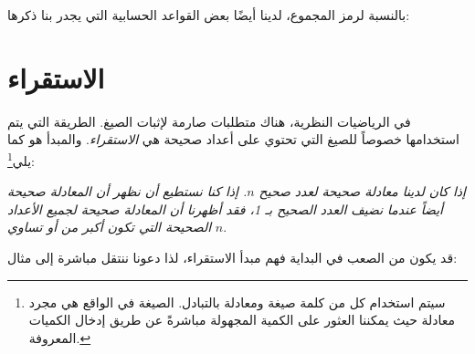 بالنسبة لرمز المجموع، لدينا أيضًا بعض القواعد الحسابية التي يجدر بنا ذكرها:\regv
{}

\newpage
{}

\newpage
\section{الاستقراء} 
في الرياضيات النظرية، هناك متطلبات صارمة لإثبات الصيغ. الطريقة التي يتم استخدامها خصوصاً للصيغ التي تحتوي على أعداد صحيحة هي \textit{الاستقراء}. والمبدأ هو كما يلي\footnote{سيتم استخدام كل من كلمة صيغة ومعادلة بالتبادل. الصيغة في الواقع هي مجرد معادلة حيث يمكننا العثور على الكمية المجهولة مباشرةً عن طريق إدخال الكميات المعروفة.}:\vsk

\textsl{إذا كان لدينا معادلة صحيحة لعدد صحيح $ n $. إذا كنا نستطيع أن نظهر أن المعادلة صحيحة أيضاً عندما نضيف العدد الصحيح بـ 1، فقد أظهرنا أن المعادلة صحيحة لجميع الأعداد الصحيحة التي تكون أكبر من أو تساوي} $ n $.\vsk

قد يكون من الصعب في البداية فهم مبدأ الاستقراء، لذا دعونا ننتقل مباشرة إلى مثال:\vsk

